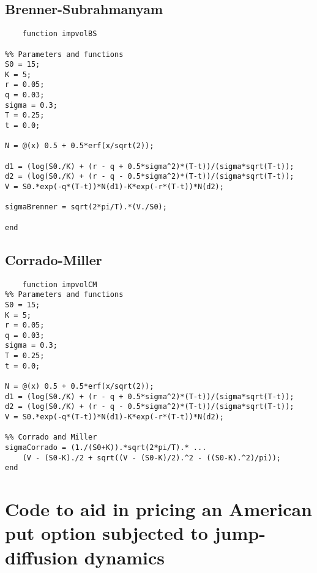 \subsection{Brenner-Subrahmanyam}
\begin{lstlisting}
    function impvolBS

%% Parameters and functions
S0 = 15;
K = 5;
r = 0.05;
q = 0.03;
sigma = 0.3;
T = 0.25;
t = 0.0;

N = @(x) 0.5 + 0.5*erf(x/sqrt(2));

d1 = (log(S0./K) + (r - q + 0.5*sigma^2)*(T-t))/(sigma*sqrt(T-t));
d2 = (log(S0./K) + (r - q - 0.5*sigma^2)*(T-t))/(sigma*sqrt(T-t));
V = S0.*exp(-q*(T-t))*N(d1)-K*exp(-r*(T-t))*N(d2);

sigmaBrenner = sqrt(2*pi/T).*(V./S0);

end
\end{lstlisting}

\subsection{Corrado-Miller}
\begin{lstlisting}
    function impvolCM
%% Parameters and functions
S0 = 15;
K = 5;
r = 0.05;
q = 0.03;
sigma = 0.3;
T = 0.25;
t = 0.0;

N = @(x) 0.5 + 0.5*erf(x/sqrt(2));
d1 = (log(S0./K) + (r - q + 0.5*sigma^2)*(T-t))/(sigma*sqrt(T-t));
d2 = (log(S0./K) + (r - q - 0.5*sigma^2)*(T-t))/(sigma*sqrt(T-t));
V = S0.*exp(-q*(T-t))*N(d1)-K*exp(-r*(T-t))*N(d2);

%% Corrado and Miller
sigmaCorrado = (1./(S0+K)).*sqrt(2*pi/T).* ...
    (V - (S0-K)./2 + sqrt((V - (S0-K)/2).^2 - ((S0-K).^2)/pi));
end
\end{lstlisting}

\section{Code to aid in pricing an American put option subjected to jump-diffusion dynamics}
